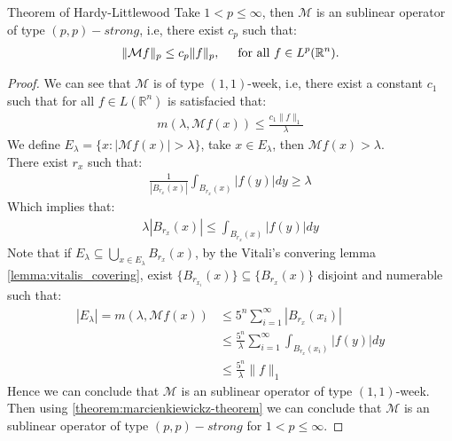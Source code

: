 \begin{theorem}{Theorem of Hardy-Littlewood}
  Take $1<p\leq \infty$, then $\mathcal{M}$ is an sublinear operator of type $(p,p)-strong$, i.e, there exist $c_{p}$ such that:
  \begin{align*}
    \|\mathcal{M}f\|_{p}\leq c_p\|f\|_{p}, \hspace{0.5cm}\text{for all $f\in L^{p}(\mathbb{R}^{n}).$}
  \end{align*}
\end{theorem}

\begin{proof} 
  We can see that $\mathcal{M}$ is of type $(1,1)$-week, i.e, there exist a constant $c_1$ such that for all $f\in L(\mathbb{R}^{n})$ is satisfacied that:
  \begin{align*}
    m(\lambda,\mathcal{M}f(x))\leq \frac{c_1\|f\|_{1}}{\lambda}
  \end{align*}
  We define $E_{\lambda}=\{x:|\mathcal{M}f(x)|>\lambda\}$, take $x\in E_{\lambda}$, then $\mathcal{M}f(x)>\lambda$.\\
  There exist $r_x$ such that:
  \begin{align*}
    \frac{1}{|B_{r_x}(x)|}\int_{B_{r_x}(x)}|f(y)|dy\geq \lambda
  \end{align*}
  Which implies that:
  \begin{align*}
    \lambda|B_{r_x}(x)|\leq \int_{B_{r_x}(x)}|f(y)|dy
  \end{align*}
  Note that if $E_\lambda\subseteq \bigcup_{x\in E_{\lambda}}B_{r_x}(x)$, by the Vitali's convering lemma \cref{lemma:vitalis_covering}, exist $\{B_{r_{x_i}}(x)\}\subseteq \{B_{r_x}(x)\}$ disjoint and numerable such that:
  \begin{align*}
    |E_\lambda|=m(\lambda,\mathcal{M}f(x))&\leq 5^{n}\sum_{i=1}^{\infty}|B_{r_{x}}(x_i)|\\
    &\leq \frac{5^n}{\lambda}\sum_{i=1}^{\infty}\int_{B_{r_x}(x_i)}|f(y)|dy\\
    &\leq \frac{5^n}{\lambda}\|f\|_{1}
  \end{align*}
  Hence we can conclude that $\mathcal{M}$ is an sublinear operator of type $(1,1)$-week.\\
  Then using \cref{theorem:marcienkiewickz-theorem} we can conclude that $\mathcal{M}$ is an sublinear operator of type $(p,p)-strong$ for $1<p\leq \infty$. 
\end{proof}
